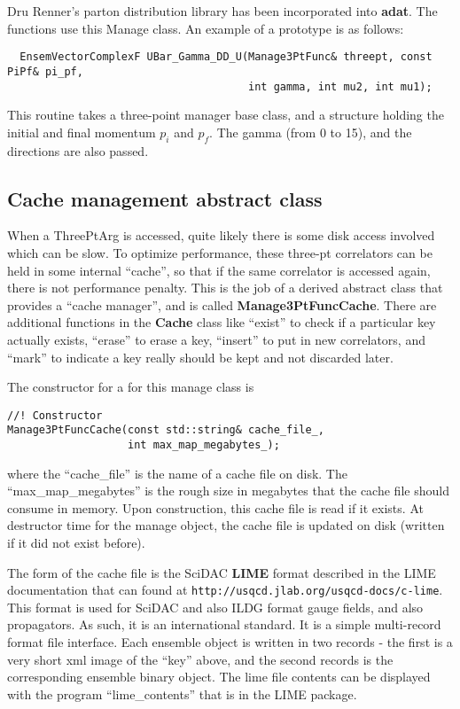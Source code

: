 \documentclass[11pt]{article}
\begin{document}
Dru Renner's parton distribution library has been incorporated into {\bf adat}.
The functions use this Manage class. An example of a prototype is as follows:
\begin{verbatim}
  EnsemVectorComplexF UBar_Gamma_DD_U(Manage3PtFunc& threept, const PiPf& pi_pf, 
                                      int gamma, int mu2, int mu1);
\end{verbatim}
This routine takes a three-point manager base class, and a structure holding the
initial and final momentum $p_i$ and $p_f$. The gamma (from 0 to 15), and the
directions are also passed.

\subsection{Cache management abstract class}

When a ThreePtArg is accessed, quite likely there is some disk access
involved which can be slow. To optimize performance, these three-pt
correlators can be held in some internal ``cache'', so that if the
same correlator is accessed again, there is not performance penalty.
This is the job of a derived abstract class that provides 
a ``cache manager'', and is called {\bf Manage3PtFuncCache}.
There are additional functions in the {\bf Cache} class 
like ``exist'' to check if a particular
key actually exists, ``erase'' to erase a key, ``insert'' to put in
new correlators, and ``mark'' to indicate a key really should be kept
and not discarded later.

The constructor for a for this manage class is
\begin{verbatim}
//! Constructor
Manage3PtFuncCache(const std::string& cache_file_, 
                   int max_map_megabytes_);
\end{verbatim}
where the ``cache\_file'' is the name of a cache file on disk. The
``max\_map\_megabytes'' is the rough size in megabytes that the cache
file should consume in memory.  Upon construction, this cache file is
read if it exists. At destructor time for the manage object, the cache
file is updated on disk (written if it did not exist before). 

The form of the cache file is the SciDAC {\bf LIME} format described
in the LIME documentation that can found at
{\tt http://usqcd.jlab.org/usqcd-docs/c-lime}. This format is used for
SciDAC and also ILDG format gauge fields, and also propagators. As such,
it is an international standard. It is a simple multi-record format file
interface. Each ensemble object is written in two records - the first is
a very short xml image of the ``key'' above, and the second records
is the corresponding ensemble binary object. The lime file contents can
be displayed with the program ``lime\_contents'' that is in the LIME package.
\end{document}
